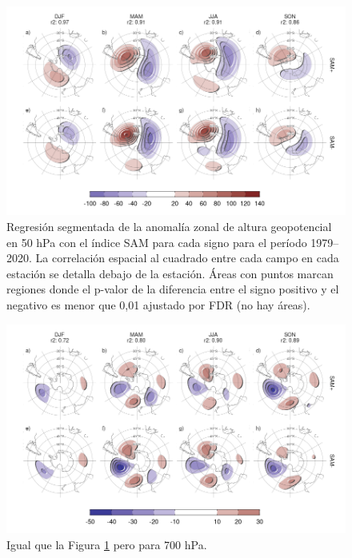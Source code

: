 \documentclass[12pt,oneside,a4paper]{reedthesis}
\begin{document}
\begin{figure}

{\centering \includegraphics{figures/30-sam/sign-regression-50-1} 

}

\caption{Regresión segmentada de la anomalía zonal de altura geopotencial en 50 hPa con el índice SAM para cada signo para el período 1979--2020. La correlación espacial al cuadrado entre cada campo en cada estación se detalla debajo de la estación. Áreas con puntos marcan regiones donde el p-valor de la diferencia entre el signo positivo y el negativo es menor que 0,01 ajustado por FDR (no hay áreas).}\label{fig:sign-regression-50}
\end{figure}



\begin{figure}

{\centering \includegraphics{figures/30-sam/sign-regression-700-1} 

}

\caption{Igual que la Figura \ref{fig:sign-regression-50} pero para 700 hPa.}\label{fig:sign-regression-700}
\end{figure}
\end{document}
